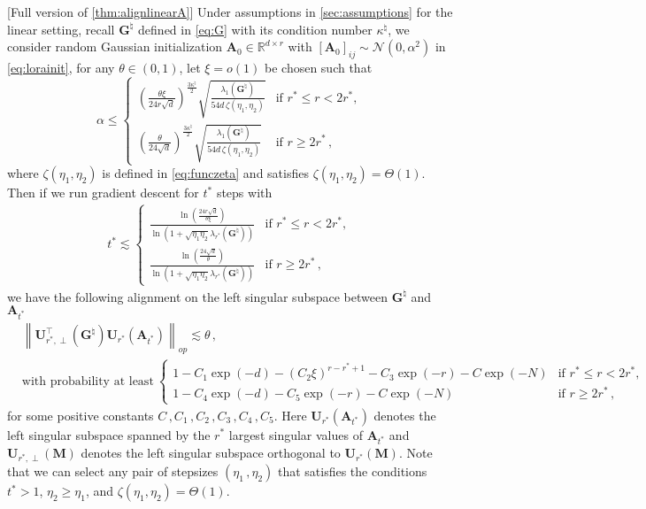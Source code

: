 \begin{theorem}\label{thm:alignlinearA:full}[Full version of \cref{thm:alignlinearA}]
    Under assumptions in \cref{sec:assumptions} for the linear setting, recall ${\bm G}^{\natural}$ defined in \cref{eq:G} with its condition number $\kappa^{\natural}$, we consider random Gaussian initialization $\bm A_0 \in \mathbb{R}^{d \times r}$ with $[\bm A_0]_{ij} \sim \mathcal{N}(0, \alpha^2)$ in \eqref{eq:lorainit}, for any $\theta \in (0,1)$, let $\xi = o(1)$ be chosen such that
\begin{equation*}
    \alpha \leq
\begin{cases} 
\left(\frac{\theta \xi}{24r\sqrt{d}}\right)^{\frac{3\kappa^\natural}{2}}\sqrt{\frac{\lambda_1({\bm G}^{\natural})}{54d\,\zeta(\eta_1, \eta_2)}} & \text{if } r^*\leq r < 2r^*, \\
\left(\frac{\theta}{24\sqrt{d}}\right)^{\frac{3\kappa^\natural}{2}}\sqrt{\frac{\lambda_1({\bm G}^{\natural})}{54d\,\zeta(\eta_1, \eta_2)}} & \text{if } r \geq 2r^*\,,
\end{cases}
\end{equation*}
where $\zeta(\eta_1, \eta_2)$ is defined in \cref{eq:funczeta} and satisfies $\zeta(\eta_1, \eta_2) = \Theta(1)$.
Then if we run gradient descent for $t^*$ steps with
\begin{align*}
    t^* \lesssim 
    \begin{cases}
        \frac{\ln\left(\frac{24r\sqrt{d}}{\theta \xi}\right)}{\ln\left(1+\sqrt{\eta_1 \eta_2}\lambda_{r^*}\left({\bm G}^{\natural}\right)\right)}  & \text{if } r^*\leq r < 2r^*, \\
        \frac{\ln\left(\frac{24\sqrt{d}}{\theta}\right)}{\ln\left(1+\sqrt{\eta_1 \eta_2}\lambda_{r^*}\left({\bm G}^{\natural}\right)\right)}  & \text{if } r \geq 2r^*\,,
    \end{cases}
\end{align*}
we have the following alignment on the left singular subspace between $\bm G^{\natural}$ and $\bm A_{t^*}$
    \begin{align*}
        &\left\|\bm U^{\!\top}_{r^*,\perp}(  \bm G^{\natural} )\bm U_{r^*}\left(\bm A_{t^*}\right)\right\|_{op} \lesssim \theta\,,\\
        &\mbox{with probability at least}~
        \begin{cases} 
1\!-\! C_1\exp(-d) \!-\! (C_2 \xi)^{r-r^*+1} \!-\! C_3\exp(-r) \!-\! C\exp(-N) & \text{if } r^*\leq r < 2r^*, \\
1 \!-\! C_4\exp(- d) -C_5\exp(- r) -C\exp(- N) & \text{if } r \geq 2r^*\,,
\end{cases}
    \end{align*}
for some positive constants $C\,,C_1\,,C_2\,,C_3\,,C_4\,,C_5$.
Here $\bm U_{r^*}(\bm A_{t^*})$ denotes the left singular subspace spanned by the $r^*$ largest singular values of $\bm A_{t^*}$ and $\bm U_{r^*,\perp}(\bm M)$ denotes the left singular subspace orthogonal to $\bm U_{r^*}\left(\bm{M}\right)$. Note that we can select any pair of stepsizes $(\eta_1\,,\eta_2)$ that satisfies the conditions $t^*>1$, $\eta_2 \geq \eta_1$, and $\zeta(\eta_1, \eta_2) = \Theta(1)$.
\end{theorem}
